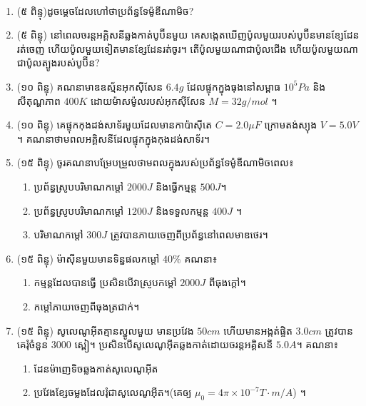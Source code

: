 \documentclass{officialexam}
\begin{document}
	\maketitle\\
	\begin{enumerate}[m]
		\item (៥ ពិន្ទុ)​ដូចម្ដេចដែលហៅថាប្រព័ន្ធទែម៉ូឌីណាមិច?
		\item (៥ ពិន្ទុ) នៅពេលចរន្តអគ្គិសនីឆ្លងកាត់បូប៊ីនមួយ គេសង្កេតឃើញប៉ូលមួយរបស់បូប៊ីនមានខ្សែដែនរត់ចេញ ហើយប៉ូលមួយទៀតមានខ្សែដែនរត់ចូរ។ តើប៉ូលមួយណាជាប៉ូលជើង ហើយប៉ូលមួយណាជាប៉ូលត្បូងរបស់បូប៊ីន?
		\item (១០ ពិន្ទុ) គណនាមាឌឧស្ម័នអុកសុីសែន $6.4g$ ដែលផ្ទុកក្នុងធុងនៅសម្ពាធ $10^{5}Pa$ និងសីតុណ្ហភាព $400K$ ដោយម៉ាសម៉ូលរបស់អុកសុីសែន $M=32g/mol$ ។
		\item (១០ ពិន្ទុ) គេផ្ទុកកុងដង់សាទ័រមួយដែលមានកាប៉ាសុីតេ $C=2.0\mu F$ ក្រោមតង់ស្យុង $V=5.0V$។ គណនាថាមពលអគ្គិសនីដែលផ្ទុកក្នុងកុងដង់សាទ័រ។
		\item (១៥ ពិន្ទុ) ចូរគណនាបម្រែបម្រួលថាមពលក្នុងរបស់ប្រព័ន្ធទែម៉ូឌីណាមិចពេល៖
		\begin{enumerate}[k]
			\item ប្រព័ន្ធស្រូបបរិមាណកម្តៅ $2000J$ និងធ្វើកម្មន្ត $500J$។
			\item ប្រព័ន្ធស្រូបបរិមាណកម្តៅ $1200J$ និងទទួលកម្មន្ត $400J$ ។
			\item បរិមាណកម្តៅ $300J$ ត្រូវបានភាយចេញពីប្រព័ន្ធនៅពេលមាឌថេរ។
		\end{enumerate}
		\item (១៥ ពិន្ទុ) ម៉ាសុីនមួយមានទិន្នផលកម្តៅ $40 \%$ គណនា៖
		\begin{enumerate}[k]
			\item កម្មន្តដែលបានធ្វើ ប្រសិនបើវាស្រូបកម្ដៅ $2000J$ ពីធុងក្តៅ។
			\item កម្តៅភាយចេញពីធុងត្រជាក់។
		\end{enumerate} 
		\item (១៥ ពិន្ទុ) សូលេណូអុីតគ្មានស្នូលមួយ មានប្រវែង $50cm$ ហើយមានអង្កត់ផ្ចិត $3.0cm$ ត្រូវបានគេរុំចំនួន $3000$ ស្ពៀ។ ប្រសិនបើសូលេណូអុីតឆ្លងកាត់ដោយចរន្តអគ្គិសនី $5.0A$។ គណនា៖
		\begin{enumerate}[k]
			\item ដែនម៉ាញេទិចឆ្លងកាត់សូលេណូអុីត
			\item ប្រវែងខ្សែចម្លងដែលរុំជាសូលេណូអុីត។(គេឲ្យ $\mu_0=4\pi \times10^{-7}T\cdot m/A$) ។
		\end{enumerate}
	\end{enumerate}
\\
\end{document}
